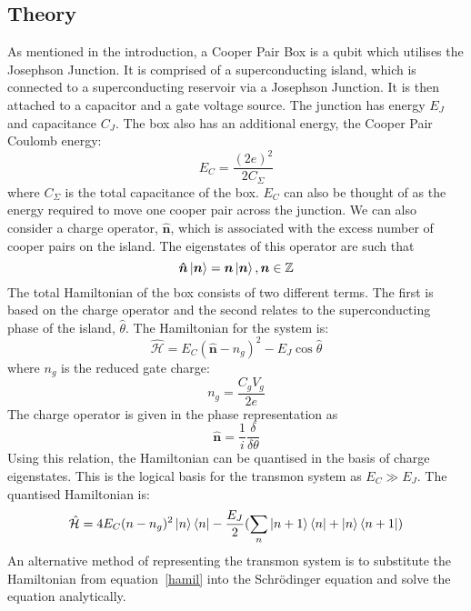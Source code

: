 \documentclass[11pt]{article}
\newcommand*{\hatH}{\hat{\mathcal{H}}}
\begin{document}
   \subsection{Theory}
   As mentioned in the introduction, a Cooper Pair Box is a qubit which utilises the Josephson Junction. It is comprised of a superconducting island, which is connected to a superconducting reservoir via a Josephson Junction. It is then attached to a capacitor and a gate voltage source. The junction has energy $E_J$ and capacitance $C_J$. The box also has an additional energy, the Cooper Pair Coulomb energy:
	\begin{equation}
	E_C =  \frac{(2e)^2}{2C_\Sigma}
	\end{equation}
	where $C_\Sigma$ is the total capacitance of the box. $E_C$ can also be thought of as the energy required to move one cooper pair across the junction. We can also consider a charge operator, $\boldsymbol{\hat{n}}$, which is associated with the excess number of cooper pairs on the island. The eigenstates of this operator are such that
	\begin{equation}
	\boldsymbol{\hat{n}}\ket{\boldsymbol{n}} = \boldsymbol{n}\ket{\boldsymbol{n}},  \boldsymbol{n} \in \mathbb{Z}
	\end{equation}
The total Hamiltonian of the box consists of two different terms. The first is based on the charge operator and the second relates to the superconducting phase of the island, $\hat{\theta}$. The Hamiltonian for the system is:
	\begin{equation} \label{hamil}
	\hatH = E_C (\boldsymbol{\hat{n}} - n_g)^2 - E_J \cos{\hat{\theta}}
	\end{equation}
where $n_g$ is the reduced gate charge:
	\begin{equation}
	n_g = \frac{C_g V_g}{2e}
	\end{equation}
The charge operator is given in the phase representation as
	\begin{equation}
	\boldsymbol{\hat{n}} = \frac{1}{i} \frac{\delta}{\delta\theta}
	\end{equation}
Using this relation, the Hamiltonian can be quantised in the basis of charge eigenstates. This is the logical basis for the transmon system as $E_C \gg E_J$. The quantised Hamiltonian is:
	\begin{equation}
	\hatH = 4E_C (n-n_g)^2 \ket{n}\bra{n} - \frac{E_J}{2}(\sum_{n} \ket{n+1}\bra{n} + \ket{n}\bra{n+1})
	\end{equation}
An alternative method of representing the transmon system is to substitute the Hamiltonian from equation~\ref{hamil} into the Schr\"odinger equation and solve the equation analytically.
\end{document}
